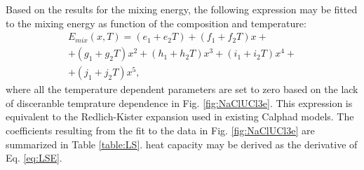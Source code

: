 \documentclass[preprint,3p,10pt,onecolumn,number,sort&compress]{elsarticle}
\begin{document}
Based on the results for the mixing energy, the following expression may be fitted to the mixing energy as function of the composition and temperature:
\begin{equation}
\begin{split}
E_{mix}(x,T)=(e_1+e_2T)+(f_1+f_2T)x+\\
+(g_1+g_2T)x^2+(h_1+h_2T)x^3+(i_1+i_2T)x^4+\\
+(j_1+j_2T)x^5,
\label{eq:LSE}
\end{split}
\end{equation}
where all the temperature dependent parameters are set to zero based on the lack of disceranble temprature dependence in Fig. \ref{fig:NaClUCl3e}. This expression is equivalent to the Redlich-Kister expansion used in existing Calphad models. The coefficients resulting from the fit to the data in Fig. \ref{fig:NaClUCl3e} are summarized in Table \ref{table:LS}. heat capacity may be derived as the derivative of Eq. \ref{eq:LSE}.
\end{document}
